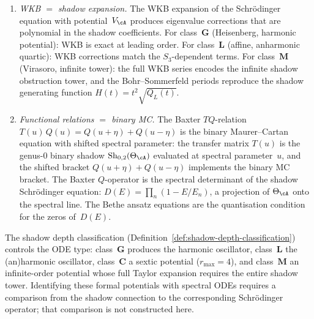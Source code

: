 \begin{remark}
\begin{enumerate}[label=\textup{(\roman*)}]
 The shadow connection pole $t_0 = (2\pi)^{-2}$ equals
 the instanton action
 $A = (2\pi)^2$
 (Proposition~\ref{prop:universal-instanton-action}).
\item \emph{WKB $=$ shadow expansion.}\enspace
 The WKB expansion of the Schr\"odinger equation
 with potential~$V_{\cA}$ produces eigenvalue
 corrections that are polynomial in the shadow
 coefficients. For class~$\mathbf{G}$
 (Heisenberg, harmonic potential): WKB is exact
 at leading order. For class~$\mathbf{L}$
 (affine, anharmonic quartic): WKB corrections
 match the $S_3$-dependent terms. For
 class~$\mathbf{M}$ (Virasoro, infinite tower):
 the full WKB series encodes the infinite shadow
 obstruction tower, and the Bohr--Sommerfeld periods
 reproduce the shadow generating function
 $H(t) = t^2\sqrt{Q_L(t)}$.
\item \emph{Functional relations $=$ binary MC.}\enspace
 The Baxter $TQ$-relation
 $T(u)\,Q(u) = Q(u{+}\eta) + Q(u{-}\eta)$
 is the binary Maurer--Cartan equation with shifted
 spectral parameter: the transfer matrix $T(u)$ is
 the genus-$0$ binary shadow
 $\mathrm{Sh}_{0,2}(\Theta_{\cA})$ evaluated at
 spectral parameter~$u$, and the shifted bracket
 $Q(u{+}\eta) + Q(u{-}\eta)$ implements the binary
 MC bracket. The Baxter $Q$-operator is the spectral
 determinant of the shadow Schr\"odinger equation:
 $D(E) = \prod_n(1 - E/E_n)$, a projection of
 $\Theta_{\cA}$ onto the spectral line.
 The Bethe ansatz equations are the
 quantisation condition for the zeros of~$D(E)$.
\end{enumerate}

The shadow depth classification
(Definition~\ref{def:shadow-depth-classification}) controls the ODE type:
class~$\mathbf{G}$ produces the harmonic oscillator,
class~$\mathbf{L}$ the (an)harmonic oscillator,
class~$\mathbf{C}$ a sextic potential ($r_{\max} = 4$),
and class~$\mathbf{M}$ an infinite-order potential
whose full Taylor expansion requires the entire shadow
tower.  Identifying these formal potentials with spectral ODEs
requires a comparison from the shadow connection to the corresponding
Schr\"odinger operator; that comparison is not constructed here.
\end{remark}

